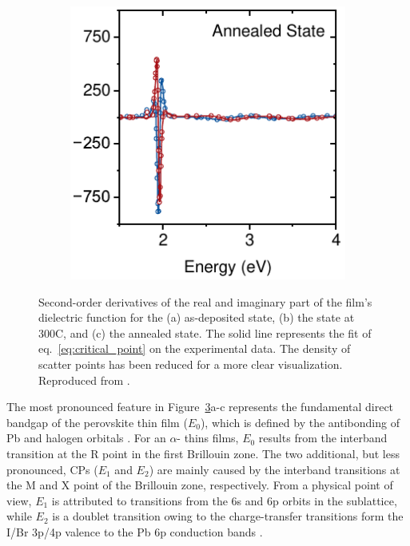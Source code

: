 \begin{figure}[ht!]
\begin{subfigure}{0.31\textwidth}
        \caption{}
        \label{fig:ellipsometry:deriv:300}
    \end{subfigure}
    \hfill
    \begin{subfigure}{0.31\textwidth}
        \includegraphics[width=\textwidth]{chapters/ellipsometry/image/Deriv_Anneal.pdf}
        \caption{}
        \label{fig:ellipsometry:deriv:anneal}
    \end{subfigure}
    \caption[Second-order derivatives of the real and imaginary part of the film's dielectric function for the as-deposited state, the state at 300\degree C, and the annealed state.]{Second-order derivatives of the real and imaginary part of the film's dielectric function for the (a) as-deposited state, (b) the state at 300\degree C, and (c) the annealed state. The solid line represents the fit of eq.~\ref{eq:critical_point} on the experimental data. The density of scatter points has been reduced for a more clear visualization. Reproduced from \cite{Papadopoulou2024InEllipsometry}.}
    \label{fig:ellipsometry:deriv}
\end{figure}


The most pronounced feature in Figure~\ref{fig:ellipsometry:deriv}a-c represents the fundamental direct bandgap of the perovskite thin film ($E_0$), which is defined by the antibonding of Pb and halogen orbitals \cite{Mannino2020Temperature-DependentCrystals}. For an $\alpha$- thins films, $E_0$ results from the interband transition at the R point in the first Brillouin zone. The two additional, but less pronounced, CPs ($E_1$ and $E_2$) are mainly caused by the interband transitions at the M and X point of the Brillouin zone, respectively. From a physical point of view, $E_1$ is attributed to transitions from the 6s and 6p orbits in the  sublattice, while $E_2$ is a doublet transition owing to the charge-transfer transitions form the I/Br 3p/4p valence to the Pb 6p conduction bands \cite{Zhao2018EllipsometricFilm}.   


